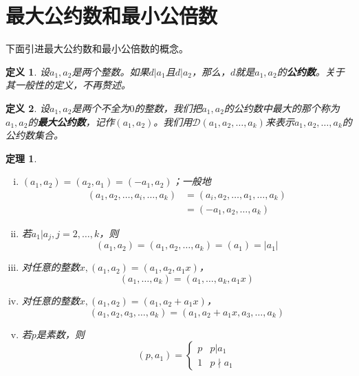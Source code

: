 \documentclass{ctexrep}
\newcommand{\bbold}[1]{\textbf{#1}}
\newcommand{\aabs}[1]{{ \left| #1 \right| }}
\newtheorem{thrm}{定理}[section]
\newtheorem{defn}{定义}[section]
\begin{document}
\section{最大公约数和最小公倍数}

下面引进最大公约数和最小公倍数的概念。

\begin{defn}
设$a_1, a_2$是两个整数。如果$d|a_1$且$d|a_2$，那么，$d$就是$a_1, a_2$的\bbold{公约数}。关于其一般性的定义，不再赘述。
\end{defn}

\begin{defn}
设$a_1,a_2$是两个不全为$0$的整数，我们把$a_1,a_2$的公约数中最大的那个称为$a_1,a_2$的\bbold{最大公约数}，记作$(a_1,a_2)$。我们用$\mathscr{D}(a_1,a_2,\dotsc,a_k)$来表示$a_1,a_2,\dotsc,a_k$的公约数集合。
\end{defn}

\begin{thrm}
\begin{enumerate}[(i)]
\item $(a_1,a_2)=(a_2,a_1)=(-a_1,a_2)$；一般地
\begin{align}
(a_1,a_2,\dotsc,a_i,\dotsc,a_k)&=(a_i,a_2,\dotsc,a_1,\dotsc,a_k)\nonumber\\
                               &=(-a_1,a_2,\dotsc,a_k)\nonumber
\end{align}
\item 若$a_1|a_j, j=2,\dotsc,k$，则
\begin{displaymath}
(a_1,a_2)=(a_1,a_2,\dotsc,a_k)=(a_1)=\aabs{a_1}
\end{displaymath}
\item 对任意的整数$x, (a_1,a_2)=(a_1,a_2,a_1 x)$，
\begin{displaymath}
(a_1,\dotsc,a_k)=(a_1,\dotsc,a_k,a_1 x)
\end{displaymath}
\item 对任意的整数$x, (a_1,a_2)=(a_1,a_2+a_1 x)$，
\begin{displaymath}
(a_1,a_2,a_3,\dotsc,a_k)=(a_1,a_2+a_1 x,a_3,\dotsc,a_k)
\end{displaymath}
\item 若$p$是素数，则
\begin{displaymath}
(p,a_1) = \left\{
  \begin{array}{ll}
  p & p | a_1\\
  1 & p \nmid a_1
  \end{array}
\right.
\end{displaymath}
\end{enumerate}
\end{thrm}
\end{document}
